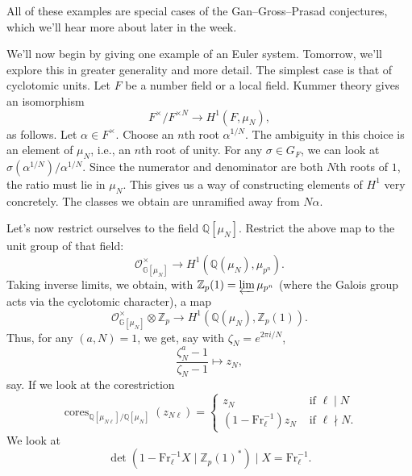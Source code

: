 \documentclass[reqno]{amsart} 
\begin{document}
All of these examples are special cases of the Gan--Gross--Prasad conjectures, which we'll hear more about later in the week.

We'll now begin by giving one example of an Euler system.  Tomorrow, we'll explore this in greater generality and more detail.  The simplest case is that of cyclotomic units.  Let $F$ be a number field or a local field.  Kummer theory gives an isomorphism
\begin{equation*}
  F^\times / F^{\times N} \rightarrow H^1(F, \mu_N),
\end{equation*}
as follows.  Let $\alpha \in F^\times$.  Choose an $n$th root $\alpha^{1/N}$.  The ambiguity in this choice is an element of $\mu_N$, i.e., an $n$th root of unity.  For any $\sigma \in G_F$, we can look at $\sigma(\alpha^{1/N}) / \alpha^{1/N}$.  Since the numerator and denominator are both $N$th roots of $1$, the ratio must lie in $\mu_N$.  This gives us a way of constructing elements of $H^1$ very concretely.  The classes we obtain are unramified away from $N \alpha$.

Let's now restrict ourselves to the field $\mathbb{Q}[\mu_N]$.  Restrict the above map to the unit group of that field:
\begin{equation*}
  \mathcal{O}_{\mathbb{G}[\mu_N]}^\times \rightarrow H^1(\mathbb{Q}(\mu_N), \mu_{p^n}).
\end{equation*}
Taking inverse limits, we obtain, with $\mathbb{Z}_p(1) = \varprojlim\mu_{p^n}$ (where the Galois group acts via the cyclotomic character), a map
\begin{equation*}
  \mathcal{O}_{\mathbb{G}[\mu_N]}^\times \otimes \mathbb{Z}_p \rightarrow H^1(\mathbb{Q}(\mu_N), \mathbb{Z}_p(1)).
\end{equation*}
Thus, for any $(a, N) = 1$, we get, say with $\zeta_N = e^{2 \pi i / N}$,
\begin{equation*}
  \frac{\zeta_N^a - 1}{\zeta_N - 1} \mapsto z_N,
\end{equation*}
say.  If we look at the corestriction
\begin{equation*}
  \operatorname{cores}_{\mathbb{Q}[\mu_{N \ell}] / \mathbb{Q}[\mu_N]}(z_{N \ell}) =
  \begin{cases}
    z_N    
    & \text{ if } \ell \mid N \\
    (1 - \mathrm{Fr}_{\ell}^{-1}) z_N
    & \text{ if } \ell \nmid N.
  \end{cases}
\end{equation*}
We look at
\begin{equation*}
  \det \left( 1 - \mathrm{Fr}_{\ell}^{-1} X \mid \mathbb{Z}_p(1)^\ast \right) \mid X = \mathrm{Fr}_{\ell}^{-1}.
\end{equation*}

{} 
\end{document}
